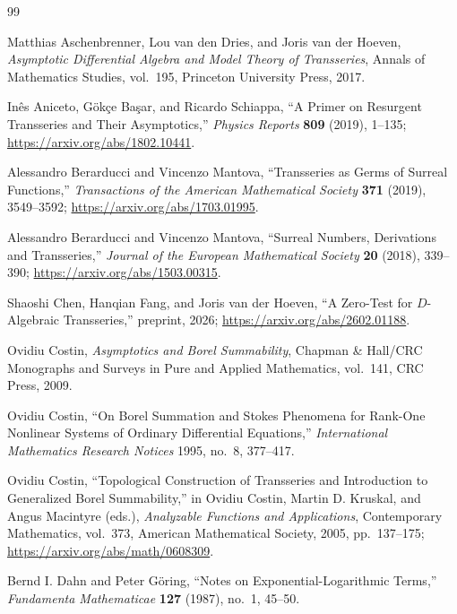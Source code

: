 \documentclass[11pt,oneside]{book}
\theoremstyle{definition}
\theoremstyle{remark}
\begin{document}
{\raggedright
\begin{thebibliography}{99}

Matthias Aschenbrenner, Lou van den Dries, and Joris van der Hoeven,
\emph{Asymptotic Differential Algebra and Model Theory of Transseries},
Annals of Mathematics Studies, vol.~195, Princeton University Press, 2017.

In\^es Aniceto, G\"ok\c{c}e Ba\c{s}ar, and Ricardo Schiappa,
``A Primer on Resurgent Transseries and Their Asymptotics,''
\emph{Physics Reports} \textbf{809} (2019), 1--135;
\url{https://arxiv.org/abs/1802.10441}.

Alessandro Berarducci and Vincenzo Mantova,
``Transseries as Germs of Surreal Functions,''
\emph{Transactions of the American Mathematical Society}
\textbf{371} (2019), 3549--3592;
\url{https://arxiv.org/abs/1703.01995}.

Alessandro Berarducci and Vincenzo Mantova,
``Surreal Numbers, Derivations and Transseries,''
\emph{Journal of the European Mathematical Society}
\textbf{20} (2018), 339--390;
\url{https://arxiv.org/abs/1503.00315}.

Shaoshi Chen, Hanqian Fang, and Joris van der Hoeven,
``A Zero-Test for $D$-Algebraic Transseries,'' preprint, 2026;
\url{https://arxiv.org/abs/2602.01188}.

Ovidiu Costin,
\emph{Asymptotics and Borel Summability},
Chapman \& Hall/CRC Monographs and Surveys in Pure and Applied Mathematics,
vol.~141, CRC Press, 2009.

Ovidiu Costin,
``On Borel Summation and Stokes Phenomena for Rank-One Nonlinear Systems of
Ordinary Differential Equations,''
\emph{International Mathematics Research Notices} 1995, no.~8, 377--417.

Ovidiu Costin,
``Topological Construction of Transseries and Introduction to Generalized
Borel Summability,'' in Ovidiu Costin, Martin D. Kruskal, and Angus Macintyre
(eds.), \emph{Analyzable Functions and Applications}, Contemporary
Mathematics, vol.~373, American Mathematical Society, 2005, pp.~137--175;
\url{https://arxiv.org/abs/math/0608309}.

Bernd I. Dahn and Peter G\"oring,
``Notes on Exponential-Logarithmic Terms,''
\emph{Fundamenta Mathematicae} \textbf{127} (1987), no.~1, 45--50.


\end{thebibliography}}
\end{document}
